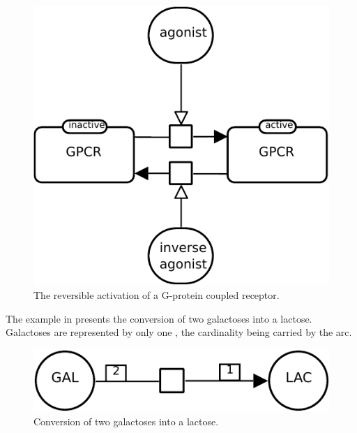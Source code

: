 \begin{figure}[H]
  \centering
  \includegraphics[scale = 0.8]{images/build/process_modulated_example.pdf}
  \caption{The reversible activation of a G-protein coupled receptor.}
  \label{fig:trans-mod}
\end{figure}

The example in  presents the conversion of two galactoses into a lactose.  Galactoses are represented by only one , the cardinality being carried by the  arc.

\begin{figure}[H]
  \centering
  \includegraphics[scale = 0.8]{images/build/process_dimerisation_example.pdf}
  \caption{Conversion of two galactoses into a lactose.}
  \label{fig:trans-dim}
\end{figure}

